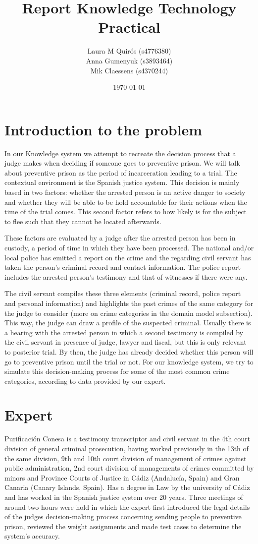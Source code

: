 \documentclass{article}
\title{\textbf{Report Knowledge Technology Practical}}
\author{Laura M Quirós (s4776380) \\ Anna Gumenyuk (s3893464) \\ Mik Claessens (s4370244)}
\date{\today}
\begin{document}
\maketitle

\section{Introduction to the problem}
In our Knowledge system we attempt to recreate the decision process that a judge makes when deciding if someone goes to preventive prison. We will talk about preventive prison as the period of incarceration leading to a trial. The contextual environment is the Spanish justice system. This decision is mainly based in two factors: whether the arrested person is an active danger to society and whether they will be able to be hold accountable for their actions when the time of the trial comes. This second factor refers to how likely is for the subject to flee such that they cannot be located afterwards. 

These factors are evaluated by a judge after the arrested person has been in custody, a period of time in which they have been processed. The national and/or local police has emitted a report on the crime and the regarding civil servant has taken the person's criminal record and contact information. The police report includes the arrested person's testimony and that of witnesses if there were any. 

The civil servant compiles these three elements (criminal record, police report and personal information) and highlights the past crimes of the same category for the judge to consider (more on crime categories in the domain model subsection). This way, the judge can draw a profile of the suspected criminal. Usually there is a hearing with the arrested person in which a second testimony is compiled by the civil servant in presence of judge, lawyer and fiscal, but this is only relevant to posterior trial. By then, the judge has already decided whether this person will go to preventive prison until the trial or not.
For our knowledge system, we try to simulate this decision-making process for some of the most common crime categories, according to data provided by our expert.

\section{Expert}
Purificación Conesa is a testimony transcriptor and civil servant in the 4th court division of general criminal prosecution, having worked previously in the 13th of the same division, 9th and 10th court division of management of crimes against public administration, 2nd court division of managements of crimes committed by minors and Province Courts of Justice in Cádiz (Andalucía, Spain) and Gran Canaria (Canary Islands, Spain). Has a degree in Law by the university of Cádiz and has worked in the Spanish justice system over 20 years. Three meetings of around two hours were hold in which the expert first introduced the legal details of the judges decision-making process concerning sending people to preventive prison, reviewed the weight assignments and made test cases to determine the system's accuracy.
\end{document}
